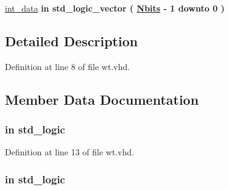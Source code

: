 \begin{DoxyCompactItemize}
\item 
\hyperlink{classwt_a9e24e3e60e3f24bab11f642255ba1bd4}{int\+\_\+data}  {\bfseries {\bfseries \textcolor{keywordflow}{in}\textcolor{vhdlchar}{ }}} {\bfseries \textcolor{comment}{std\+\_\+logic\+\_\+vector}\textcolor{vhdlchar}{ }\textcolor{vhdlchar}{(}\textcolor{vhdlchar}{ }\textcolor{vhdlchar}{ }\textcolor{vhdlchar}{ }\textcolor{vhdlchar}{ }{\bfseries \hyperlink{classwt_a8b45761acb3f2e683677c4eb77d442b0}{Nbits}} \textcolor{vhdlchar}{-\/}\textcolor{vhdlchar}{ } \textcolor{vhdldigit}{1} \textcolor{vhdlchar}{ }\textcolor{keywordflow}{downto}\textcolor{vhdlchar}{ }\textcolor{vhdlchar}{ } \textcolor{vhdldigit}{0} \textcolor{vhdlchar}{ }\textcolor{vhdlchar}{)}\textcolor{vhdlchar}{ }} 
\end{DoxyCompactItemize}


\subsection{Detailed Description}


Definition at line 8 of file wt.\+vhd.



\subsection{Member Data Documentation}
\hypertarget{classwt_a4a4609c199d30b3adebbeb3a01276ec5}{}
\subsubsection[{clk}]{ {\bfseries \textcolor{keywordflow}{in}\textcolor{vhdlchar}{ }} {\bfseries \textcolor{comment}{std\+\_\+logic}\textcolor{vhdlchar}{ }} \hspace{0.3cm}{\ttfamily [Port]}}\label{classwt_a4a4609c199d30b3adebbeb3a01276ec5}


Definition at line 13 of file wt.\+vhd.

\hypertarget{classwt_adcf9c6f5161d039addbda5819bee64a3}{}
\subsubsection[{en}]{ {\bfseries \textcolor{keywordflow}{in}\textcolor{vhdlchar}{ }} {\bfseries \textcolor{comment}{std\+\_\+logic}\textcolor{vhdlchar}{ }} \hspace{0.3cm}{\ttfamily [Port]}}\label{classwt_adcf9c6f5161d039addbda5819bee64a3}


